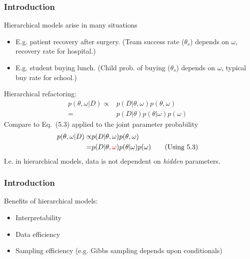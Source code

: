 \documentclass[usenames,dvipsnames,table]{beamer}
\begin{document}
\begin{frame}
\frametitle{Introduction}
Hierarchical models arise in many situations
\begin{itemize}
\item E.g. patient recovery after surgery. (Team success rate ($\theta_s$) depends on $\omega$, recovery rate for hospital.)
\item E.g. student buying lunch. (Child prob. of buying ($\theta_s$) depends on $\omega$, typical buy rate for school.)
\end{itemize}

Hierarchical refactoring:
\begin{align*}
p(\theta, \omega|D) \propto& p(D|\theta, \omega)p(\theta, \omega)\\
                          =& p(D|\theta) p(\theta|\omega)p(\omega) \tag{9.1}
\end{align*}
Compare to Eq.~(5.3) applied to the joint parameter probability
\begin{align*}
p(\theta, \omega|D) \propto& p(D|\theta, \omega)p(\theta, \omega)\\
                          =& p(D|\theta\textcolor{red}{, \omega})p(\theta|\omega)p(\omega) \tag{Using 5.3}
\end{align*}
I.e. in hierarchical models, data is not dependent on \emph{hidden} parameters.
\end{frame}

\begin{frame}
\frametitle{Introduction}
Benefits of hierarchical models:
\begin{itemize}
\item Interpretability
\item Data efficiency
\item Sampling efficiency (e.g. Gibbs sampling depends upon conditionals)
\end{itemize}
\end{frame}
\end{document}
